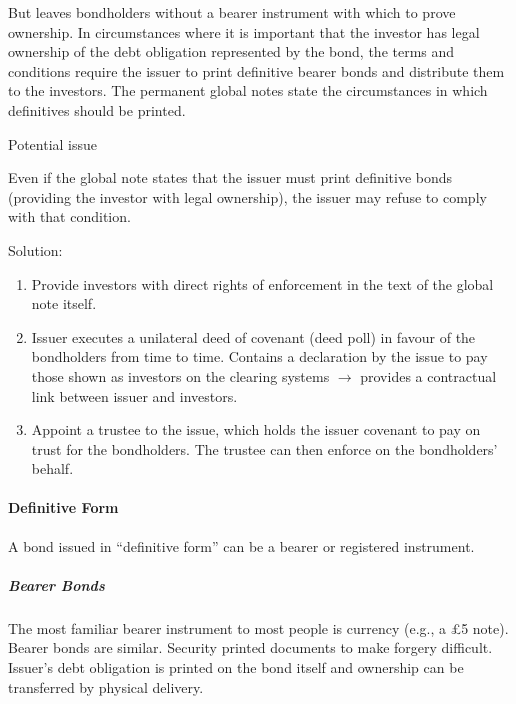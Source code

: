 \documentclass[
]{article}
\providecommand{\tightlist}{%
  \setlength{\itemsep}{0pt}\setlength{\parskip}{0pt}}
\newenvironment{env-95ad9997-05d6-404b-9a47-41a0f84718d8}
{
    \savenotes\tcolorbox[blanker,breakable,left=5pt,borderline west={2pt}{-4pt}{orange}]
}
{
    \endtcolorbox\spewnotes
}
\begin{document}
But leaves bondholders without a bearer instrument with which to prove
ownership. In circumstances where it is important that the investor has
legal ownership of the debt obligation represented by the bond, the
terms and conditions require the issuer to print definitive bearer bonds
and distribute them to the investors. The permanent global notes state
the circumstances in which definitives should be printed.

\begin{env-95ad9997-05d6-404b-9a47-41a0f84718d8}

Potential issue

Even if the global note states that the issuer must print definitive
bonds (providing the investor with legal ownership), the issuer may
refuse to comply with that condition.

\end{env-95ad9997-05d6-404b-9a47-41a0f84718d8}

Solution:

\begin{enumerate}
\tightlist
\item
  Provide investors with direct rights of enforcement in the text of the
  global note itself.
\item
  Issuer executes a unilateral deed of covenant (deed poll) in favour of
  the bondholders from time to time. Contains a declaration by the issue
  to pay those shown as investors on the clearing systems
  {\(\rightarrow\)} provides a contractual link between issuer and
  investors.
\item
  Appoint a trustee to the issue, which holds the issuer covenant to pay
  on trust for the bondholders. The trustee can then enforce on the
  bondholders' behalf.
\end{enumerate}

\hypertarget{definitive-form}{%
\paragraph{Definitive Form}\label{definitive-form}}

A bond issued in ``definitive form'' can be a bearer or registered
instrument.

\hypertarget{bearer-bonds}{%
\subparagraph{Bearer Bonds}\label{bearer-bonds}}

The most familiar bearer instrument to most people is currency (e.g., a
£5 note). Bearer bonds are similar. Security printed documents to make
forgery difficult. Issuer's debt obligation is printed on the bond
itself and ownership can be transferred by physical delivery.
\end{document}
